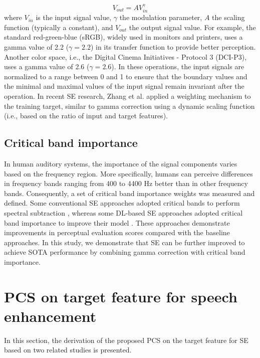 \documentclass[a4paper]{article}
\begin{document}
\begin{equation}
\label{equation:gamma}
V_{out} = AV_{in}^\gamma
\end{equation}
where $V_{in}$ is the input signal value, $\gamma$ the modulation parameter, $A$ the scaling function (typically a constant), and $V_{out}$ the output signal value. For example, the standard red-green-blue (sRGB), widely used in monitors and printers, uses a gamma value of 2.2 ($\gamma = 2.2$) in its transfer function to provide better perception. Another color space, i.e., the Digital Cinema Initiatives - Protocol 3 (DCI-P3), uses a gamma value of 2.6 ($\gamma = 2.6$). In these operations, the input signals are normalized to a range between 0 and 1 to ensure that the boundary values and the minimal and maximal values of the input signal remain invariant after the operation. In recent SE research, Zhang et al. \cite{zhang2021low} applied a weighting mechanism to the training target, similar to gamma correction using a dynamic scaling function (i.e., based on the ratio of input and target features).  





\subsection{Critical band importance}
\label{ssec:criticalband}
In human auditory systems, the importance of the signal components varies based on the frequency region. More specifically, humans can perceive differences in frequency bands ranging from 400 to 4400 Hz better than in other frequency bands. Consequently, a set of critical band importance weights was measured and defined. Some conventional SE approaches adopted critical bands to perform spectral subtraction \cite{singh1998speech}, whereas some DL-based SE approaches adopted critical band importance to improve their model \cite{liu2018bone}. These approaches demonstrate improvements in perceptual evaluation scores compared with the baseline approaches. In this study, we demonstrate that SE can be further improved to achieve SOTA performance by combining gamma correction with critical band importance.

\section{PCS on target feature for speech enhancement}
In this section, the derivation of the proposed PCS on the target feature for SE based on two related studies is presented.
\end{document}
